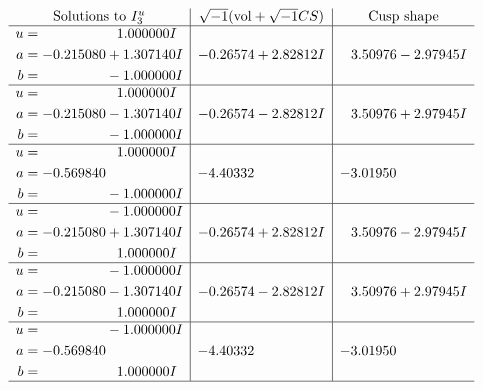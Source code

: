 \documentclass[1p]{elsarticle_modified}
\theoremstyle{definition}
\newcommand{\I}{\sqrt{-1}}
\begin{document}
$$\begin{array}{c|c|c}  
\text{Solutions to }I^u_{3}& \I (\text{vol} + \sqrt{-1}CS) & \text{Cusp shape}\\
 \hline 
\begin{aligned}
u &= \phantom{-0.000000 -}1.000000 I \\
a &= -0.215080 + 1.307140 I \\
b &= \phantom{-0.000000 } -1.000000 I\end{aligned}
 & -0.26574 + 2.82812 I & \phantom{-}3.50976 - 2.97945 I \\ \hline\begin{aligned}
u &= \phantom{-0.000000 -}1.000000 I \\
a &= -0.215080 - 1.307140 I \\
b &= \phantom{-0.000000 } -1.000000 I\end{aligned}
 & -0.26574 - 2.82812 I & \phantom{-}3.50976 + 2.97945 I \\ \hline\begin{aligned}
u &= \phantom{-0.000000 -}1.000000 I \\
a &= -0.569840\phantom{ +0.000000I} \\
b &= \phantom{-0.000000 } -1.000000 I\end{aligned}
 & -4.40332\phantom{ +0.000000I} & -3.01950\phantom{ +0.000000I} \\ \hline\begin{aligned}
u &= \phantom{-0.000000 } -1.000000 I \\
a &= -0.215080 + 1.307140 I \\
b &= \phantom{-0.000000 -}1.000000 I\end{aligned}
 & -0.26574 + 2.82812 I & \phantom{-}3.50976 - 2.97945 I \\ \hline\begin{aligned}
u &= \phantom{-0.000000 } -1.000000 I \\
a &= -0.215080 - 1.307140 I \\
b &= \phantom{-0.000000 -}1.000000 I\end{aligned}
 & -0.26574 - 2.82812 I & \phantom{-}3.50976 + 2.97945 I \\ \hline\begin{aligned}
u &= \phantom{-0.000000 } -1.000000 I \\
a &= -0.569840\phantom{ +0.000000I} \\
b &= \phantom{-0.000000 -}1.000000 I\end{aligned}
 & -4.40332\phantom{ +0.000000I} & -3.01950\phantom{ +0.000000I}\\
 \hline 
 \end{array}$$\newpage
\end{document}
